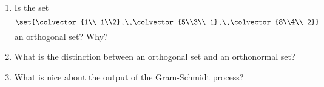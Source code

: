 \begin{enumerate}
%
\item Is the set 
%
\begin{equation*}
\set{\colvector{1\\-1\\2},\,\colvector{5\\3\\-1},\,\colvector{8\\4\\-2}}
\end{equation*}
%
an orthogonal set?  Why?
%
\item What is the distinction between an orthogonal set and an orthonormal set?
%
\item  What is nice about the output of the Gram-Schmidt process?
%
\end{enumerate}